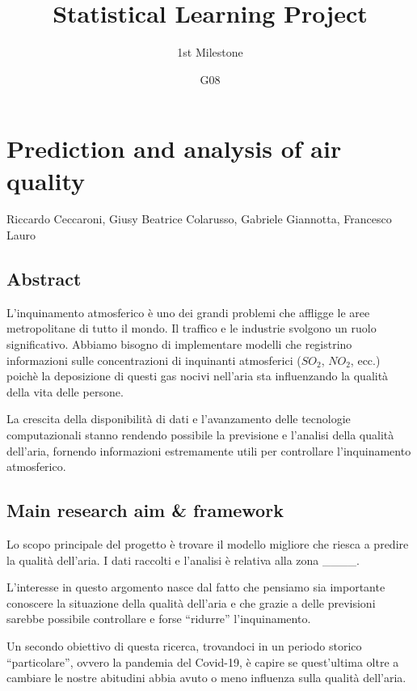 \documentclass[
  12pt,
]{article}
\title{Statistical Learning Project}
\author{1st Milestone}
\date{G08}
\begin{document}
\maketitle

\hypertarget{prediction-and-analysis-of-air-quality}{%
\section{Prediction and analysis of air
quality}\label{prediction-and-analysis-of-air-quality}}

Riccardo Ceccaroni, Giusy Beatrice Colarusso, Gabriele Giannotta,
Francesco Lauro

\hypertarget{abstract}{%
\subsection{Abstract}\label{abstract}}

L'inquinamento atmosferico è uno dei grandi problemi che affligge le
aree metropolitane di tutto il mondo. Il traffico e le industrie
svolgono un ruolo significativo. Abbiamo bisogno di implementare modelli
che registrino informazioni sulle concentrazioni di inquinanti
atmosferici (\(SO_2\), \(NO_2\), ecc.) poichè la deposizione di questi
gas nocivi nell'aria sta influenzando la qualità della vita delle
persone.

La crescita della disponibilità di dati e l'avanzamento delle tecnologie
computazionali stanno rendendo possibile la previsione e l'analisi della
qualità dell'aria, fornendo informazioni estremamente utili per
controllare l'inquinamento atmosferico.

\hypertarget{main-research-aim-framework}{%
\subsection{Main research aim \&
framework}\label{main-research-aim-framework}}

Lo scopo principale del progetto è trovare il modello migliore che
riesca a predire la qualità dell'aria. I dati raccolti e l'analisi è
relativa alla zona \_\_\_\_.

L'interesse in questo argomento nasce dal fatto che pensiamo sia
importante conoscere la situazione della qualità dell'aria e che grazie
a delle previsioni sarebbe possibile controllare e forse ``ridurre''
l'inquinamento.

Un secondo obiettivo di questa ricerca, trovandoci in un periodo storico
``particolare'', ovvero la pandemia del Covid-19, è capire se
quest'ultima oltre a cambiare le nostre abitudini abbia avuto o meno
influenza sulla qualità dell'aria.
\end{document}
